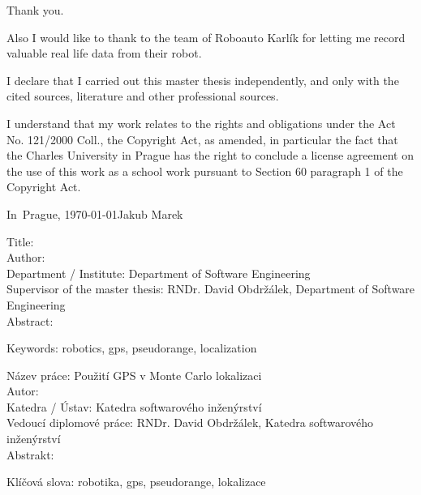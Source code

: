 

\noindent
Thank you.

Also I would like to thank to the team of Roboauto Karlík for letting me
record valuable real life data from their robot.

\cleartorecto

\vspace*{\fill}
\noindent
I declare that I carried out this master thesis independently, and only with the cited
sources, literature and other professional sources.

I understand that my work relates to the rights and obligations under the Act No.
121/2000 Coll., the Copyright Act, as amended, in particular the fact that the Charles
University in Prague has the right to conclude a license agreement on the use of this
work as a school work pursuant to Section 60 paragraph 1 of the Copyright Act.

\vspace{10mm}
\noindent In~Prague, \today\hspace{\fill}Jakub Marek\\
\vspace{10mm}
\cleartorecto

\tableofcontents*
\cleartorecto

\noindent
Title: \thetitle\\
Author: \theauthor\\
Department / Institute: Department of Software Engineering\\
Supervisor of the master thesis: RNDr. David Obdržálek, Department of Software Engineering\\

\noindent
Abstract:

\noindent
Keywords: robotics, gps, pseudorange, localization

\vspace{25mm}

\noindent
Název práce: Použití GPS v Monte Carlo lokalizaci\\
Autor: \theauthor\\
Katedra / Ústav: Katedra softwarového inženýrství\\
Vedoucí diplomové práce: RNDr. David Obdržálek, Katedra softwarového inženýrství\\

\noindent
Abstrakt:

\noindent
Klíčová slova: robotika, gps, pseudorange, lokalizace

\cleartorecto

